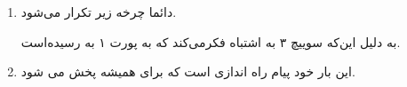 \begin{boxK}
    \begin{enumerate}
        \item 
        دائما چرخه زیر تکرار می‌شود.

        به دلیل این‌که 
        سوییچ ۳ به اشتباه فکر‌می‌کند که به پورت ۱ به 
        رسیده‌است.

        \item 
        این بار خود پیام راه اندازی است که برای همیشه پخش می شود.
        
    \end{enumerate}
\end{boxK}